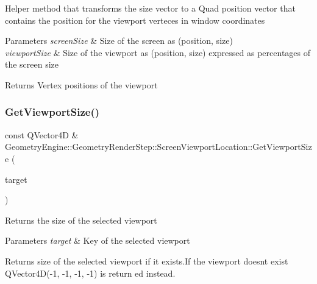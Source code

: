 Helper method that transforms the size vector to a Quad position vector that contains the position for the viewport verteces in window coordinates 
\begin{DoxyParams}{Parameters}
{\em screen\+Size} & Size of the screen as (position, size) \\
\hline
{\em viewport\+Size} & Size of the viewport as (position, size) expressed as percentages of the screen size \\
\hline
\end{DoxyParams}
\begin{DoxyReturn}{Returns}
Vertex positions of the viewport 
\end{DoxyReturn}
\mbox{\label{class_geometry_engine_1_1_geometry_render_step_1_1_screen_viewport_location_a3bcef52c0565d793d2688cf19d2c6852}} 
\subsubsection{\texorpdfstring{GetViewportSize()}{GetViewportSize()}}
{\footnotesize\ttfamily const Q\+Vector4D \& Geometry\+Engine\+::\+Geometry\+Render\+Step\+::\+Screen\+Viewport\+Location\+::\+Get\+Viewport\+Size (\begin{DoxyParamCaption}\item[{const \mbox{\hyperlink{namespace_geometry_engine_1_1_geometry_world_item_1_1_geometry_camera_a3766848bae97ff8203fa26907ac359ef}{Geometry\+World\+Item\+::\+Geometry\+Camera\+::\+Camera\+Targets}} \&}]{target }\end{DoxyParamCaption})}

Returns the size of the selected viewport 
\begin{DoxyParams}{Parameters}
{\em target} & Key of the selected viewport \\
\hline
\end{DoxyParams}
\begin{DoxyReturn}{Returns}
size of the selected viewport if it exists.\+If the viewport doesnt exist Q\+Vector4D(-\/1, -\/1, -\/1, -\/1) is return ed instead. 
\end{DoxyReturn}
\mbox{\label{class_geometry_engine_1_1_geometry_render_step_1_1_screen_viewport_location_aa9a8f050c01fbc418281534b9c3dce61}} 
